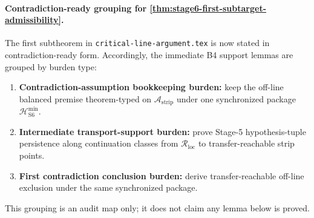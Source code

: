 \paragraph{Contradiction-ready grouping for \cref{thm:stage6-first-subtarget-admissibility}.}
The first subtheorem in \texttt{critical-line-argument.tex} is now stated in contradiction-ready form.
Accordingly, the immediate B4 support lemmas are grouped by burden type:
\begin{enumerate}
  \item \textbf{Contradiction-assumption bookkeeping burden:} keep the off-line balanced premise theorem-typed on $\mathcal{A}_{\mathrm{strip}}$ under one synchronized package $\mathcal{H}_{\mathrm{S6}}^{\min}$.
  \item \textbf{Intermediate transport-support burden:} prove Stage-5 hypothesis-tuple persistence along continuation classes from $\mathcal{R}_{\mathrm{loc}}$ to transfer-reachable strip points.
  \item \textbf{First contradiction conclusion burden:} derive transfer-reachable off-line exclusion under the same synchronized package.
\end{enumerate}
This grouping is an audit map only; it does not claim any lemma below is proved.

